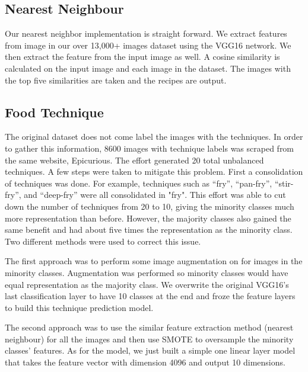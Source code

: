 \documentclass[10pt,twocolumn,letterpaper]{article}
\begin{document}
\subsection{Nearest Neighbour}
Our nearest neighbor implementation is straight forward. We extract features from image in our over 13,000+ images dataset using the VGG16 network.
We then extract the feature from the input image as well. A cosine similarity is calculated on the input image and each image in the dataset. The images with the top five similarities are taken and the recipes are output.
\subsection{Food Technique}
The original dataset does not come label the images with the techniques. In order to gather this information, 8600 images with technique labels was scraped from the same website, Epicurious. The effort generated 20 total unbalanced techniques. A few steps were taken to mitigate this problem. First a consolidation of techniques was done. For example, techniques such as “fry”, “pan-fry”, “stir-fry”, and “deep-fry” were all consolidated in "fry". This effort was able to cut down the number of techniques from 20 to 10, giving the minority classes much more representation than before. However, the majority classes also gained the same benefit and had about five times the representation as the minority class. Two different methods were used to correct this issue. 

The first approach was to perform some image augmentation on for images in the minority classes. Augmentation was performed so minority classes would have equal representation as the majority class. We overwrite the original VGG16’s last classification layer to have 10 classes at the end and froze the feature layers to build this technique prediction model.

The second approach was to use the similar feature extraction method (nearest neighbour) for all the images and then use SMOTE\cite{Authors02} to oversample the minority classes' features. As for the model, we just built a simple one linear layer model that takes the feature vector with dimension 4096 and output 10 dimensions.
\end{document}
